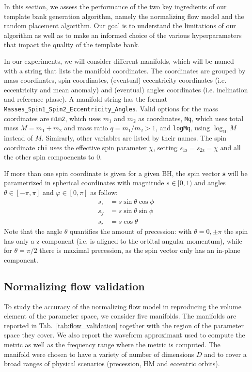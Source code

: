 \documentclass[twocolumn,showpacs,preprintnumbers,nofootinbib,prd,
superscriptaddress,10pt]{revtex4-2}
\begin{document}
In this section, we assess the performance of the two key ingredients of our template bank generation algorithm, namely the normalizing flow model and the random placement algorithm.
Our goal is to understand the limitations of our algorithm as well as to make an informed choice of the various hyperparameters that impact the quality of the template bank.

In our experiments, we will consider different manifolds, which will be named with a string that lists the manifold coordinates. The coordinates are grouped by mass coordinates, spin coordinates, (eventual) eccentricity coordinates (i.e. eccentricity and mean anomaly) and (eventual) angles coordinates (i.e. inclination and reference phase).
A manifold string has the format \texttt{Masses\_Spin1\_Spin2\_Eccentricity\_Angles}.
Valid options for the mass coordinates are \texttt{m1m2}, which uses $m_1$ and $m_2$ as coordinates, \texttt{Mq}, which uses total mass $M = m_1+m_2$ and mass ratio $q = m_1/m_2 >1$, and \texttt{logMq}, using $\log_{10}M$ instead of $M$.
Simirarly, other variables are listed by their names.
The spin coordinate \texttt{chi} uses the effective spin parameter $\chi$, setting $s_\text{1z} = s_\text{2z} = \chi$ and all the other spin compoenents to $0$.

If more than one spin coordinate is given for a given BH, the spin vector $\mathbf{s}$ will be parametrized in spherical coordinates with magnitude $s \in [0,1)$ and angles $\theta \in [-\pi,\pi]$ and $\varphi \in [0, \pi]$ as follow:
%
\begin{align}
	s_\text{x} & = s \sin\theta \cos\phi \\
	s_\text{y} & = s \sin\theta \sin\phi \\
	s_\text{z} & = s \cos\theta
\end{align}
%
Note that the angle $\theta$ quantifies the amount of precession: with $\theta = 0, \pm \pi$ the spin has only a z component (i.e. is aligned to the orbital angular momentum), while for $\theta = \pi/2$ there is maximal precession, as the spin vector only has an in-plane component.

\subsection{Normalizing flow validation} \label{sec:flow_validation}

To study the accuracy of the normalizing flow model in reproducing the volume element of the parameter space, we consider five manifolds. The manifolds are reported in Tab.~\ref{tab:flow_validation} together with the region of the parameter space they cover. We also report the waveform approximant used to compute the metric as well as the frequency range where the metric is computed.
The manifold were chosen to have a variety of number of dimensions $D$ and to cover a broad ranges of physical scenarios (precession, HM and eccentric orbits).
\end{document}
